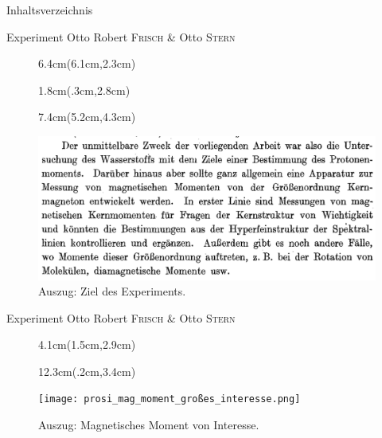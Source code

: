 \documentclass[t,9pt]{beamer}
\newcommand{\highlight}[3]{ \begin{textblock*}{#1}(#2,#3) \begin{tcolorbox} [enhanced,opacityfill=.1,colback=blue] \end{tcolorbox} \end{textblock*} } %
\begin{document}
        \begin{frame}{Inhaltsverzeichnis}
                \tableofcontents[currentsection]
        \end{frame}

        \begin{frame}{Experiment Otto Robert \textsc{Frisch} \& Otto \textsc{Stern}}
                \begin{figure}
                        \highlight{6.4cm}{6.1cm}{2.3cm}
                        \highlight{1.8cm}{.3cm}{2.8cm}
                        \highlight{7.4cm}{5.2cm}{4.3cm}
                        \includegraphics[width=\textwidth]{prosi_zweck_der_arbeit.png}        
                        \caption{Auszug: Ziel des Experiments.\cite{FrischStern1933}}
                \end{figure}
        \end{frame}

        \begin{frame}{Experiment Otto Robert \textsc{Frisch} \& Otto \textsc{Stern}}
                \begin{figure}
                        \highlight{4.1cm}{1.5cm}{2.9cm}
                        \highlight{12.3cm}{.2cm}{3.4cm}
                        \texttt{[image: prosi\_mag\_moment\_großes\_interesse.png]}
                        \caption{Auszug: Magnetisches Moment von Interesse.\cite{FrischStern1933}}
                \end{figure}
        \end{frame}
\end{document}
